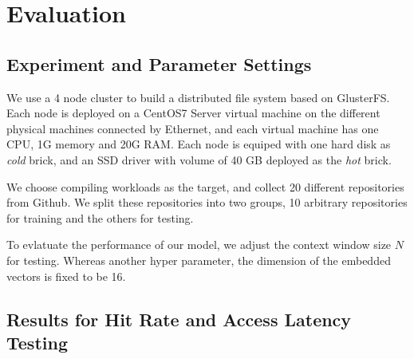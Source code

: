\documentclass[conference]{IEEEtran}
\begin{document}
\section{Evaluation}
\subsection{Experiment and Parameter Settings}
We use a 4 node cluster to build a distributed file system based on GlusterFS. 
Each node is deployed on a CentOS7 Server virtual machine on the different physical machines connected by Ethernet, 
and each virtual machine has one CPU, 1G memory and 20G RAM. Each node is equiped with one hard disk as \textit{cold} brick,
and an SSD driver with volume of 40 GB deployed as the \textit{hot} brick.

We choose compiling workloads as the target, and collect 20 different repositories from Github.
We split these repositories into two groups, 10 arbitrary repositories for training and the others for testing. 

To evlatuate the performance of our model, we adjust the context window size $N$ for testing. 
Whereas another hyper parameter, the dimension of the embedded vectors is fixed to be 16. 
\subsection{Results for Hit Rate and Access Latency Testing}

    
\end{document}
